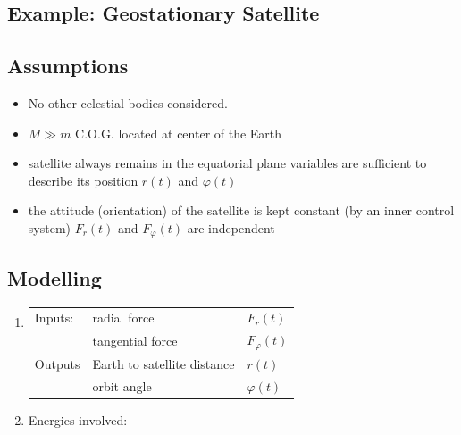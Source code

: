 \documentclass[10pt,a4paper]{scrartcl}
\begin{document}
\begin{multicols*}{3}
\vfill
\null
\newpage

\section{Example: Geostationary Satellite}



\subsection{Assumptions}

\begin{itemize}
\ncompaq
\item No other celestial bodies considered.
\item $M\gg m$ C.O.G. located at center of the Earth
\item satellite always remains in the equatorial plane variables are sufficient to describe its position $r(t)$ and $\varphi(t)$
\item the attitude (orientation) of the satellite is kept constant (by an inner control system) \dahe $F_r(t)$ and $F_\varphi(t)$ are independent
\end{itemize}

\subsection{Modelling}

\begin{enumerate}
\ncompaq
\item \begin{tabular}{lll}Inputs:&radial force&$F_r(t)$\\
&tangential force&$F_\varphi(t)$\\
Outputs&Earth to satellite distance&$r(t)$\\
&orbit angle&$\varphi(t)$
\end{tabular}
\item Energies involved:


\end{enumerate}
\end{multicols*}
\end{document}
